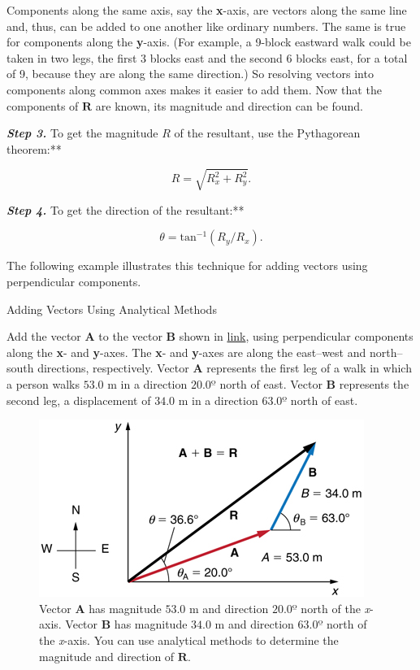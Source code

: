 \documentclass[
]{book}
\begin{document}
Components along the same axis, say the \textbf{x}-axis, are vectors along
the same line and, thus, can be added to one another like ordinary
numbers. The same is true for components along the \textbf{y}-axis. (For
example, a 9-block eastward walk could be taken in two legs, the first 3
blocks east and the second 6 blocks east, for a total of 9, because they
are along the same direction.) So resolving vectors into components
along common axes makes it easier to add them. Now that the components
of \(\mathbf{R}{}\) are known, its magnitude and direction can be found.

\emph{\textbf{Step 3.} }To get the magnitude \(R\) of the resultant, use the
Pythagorean theorem:**

\leavevmode{}%
\[{R = \sqrt{R_{x}^{2} + R_{y}^{2}}}\text{.}{}\]

\emph{\textbf{Step 4.} }To get the direction of the resultant:**

\leavevmode{}%
\[{{\theta = \text{tan}^{- 1}}({R_{y}/R_{x}})}\text{.}{}\]

The following example illustrates this technique for adding vectors
using perpendicular components.

\hypertarget{fs-id1608746}{}
Adding Vectors Using Analytical Methods

Add the vector \(\mathbf{A}{}\) to the vector \(\mathbf{B}{}\) shown in
\protect\hyperlink{import-auto-id1165296662297}{link}, using
perpendicular components along the \textbf{x}- and \textbf{y}-axes. The \textbf{x}- and
\textbf{y}-axes are along the east--west and north--south directions,
respectively. Vector \(\mathbf{A}{}\) represents the first leg of a walk
in which a person walks \({\text{53}\text{.}\text{0\ m}}{}\) in a
direction \({\text{20}\text{.}0\text{º}}{}\) north of east. Vector
\(\mathbf{B}{}\) represents the second leg, a displacement of
\({\text{34}\text{.}\text{0\ m}}{}\) in a direction
\({\text{63}\text{.}0\text{º}}{}\) north of east.

\begin{figure}
\hypertarget{import-auto-id1165296662297}{%
\centering
\includegraphics{images/Figure_03_03_08a.jpg}
\caption{Vector \(\mathbf{A}{}\) has magnitude \({\text{53}\text{.}\text{0\ m}}{}\)
and direction \({\text{20}\text{.}0º}{}\) north of the \emph{x}-axis. Vector
\(\mathbf{B}{}\) has magnitude \({\text{34}\text{.}\text{0\ m}}{}\) and
direction \({\text{63}\text{.}0\text{º}}{}\) north of the \emph{x}-axis. You
can use analytical methods to determine the magnitude and direction of
\(\mathbf{R}{}\).}\label{import-auto-id1165296662297}
}
\end{figure}
\end{document}
